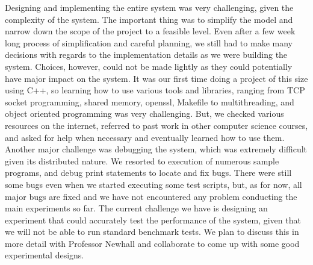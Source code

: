 \documentclass[11pt]{article}
\begin{document}
Designing and implementing the entire system was very challenging, given the complexity of the system. The important thing was to simplify the model and narrow down the scope of the project to a feasible level. Even after a few week long process of simplification and careful planning, we still had to make many decisions with regards to the implementation details as we were building the system. Choices, however, could not be made lightly as they could potentially have major impact on the system. It was our first time doing a project of this size using C++, so learning how to use various tools and libraries, ranging from TCP socket programming, shared memory, openssl, Makefile to multithreading, and object oriented programming was very challenging. But, we checked various resources on the internet, referred to past work in other computer science courses, and asked for help when necessary and eventually learned how to use them. Another major challenge was debugging the system, which was extremely difficult given its distributed nature. We resorted to execution of numerous sample programs, and debug print statements to locate and fix bugs. There were still some bugs even when we started executing some test scripts, but, as for now, all major bugs are fixed and we have not encountered any problem conducting the main experiments so far. The current challenge we have is designing an experiment that could accurately test the performance of the system, given that we will not be able to run standard benchmark tests. We plan to discuss this in more detail with Professor Newhall and collaborate to come up with some good experimental designs.
\end{document}
